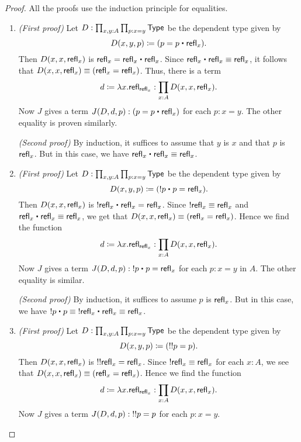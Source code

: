 \begin{proof}
  All the proofs use the induction principle for equalities.
  \begin{enumerate}
  \item \emph{(First proof)} Let $D:\prod_{x,y:A}\prod_{p:x=y} \mathsf{Type}$ be the dependent type given by 
    \begin{equation*}
      D(x,y,p)\coloneqq (p= p\ct \refl{x}).
    \end{equation*}
    Then $D(x,x,\mathsf{refl}_{x})$ is $\refl{x}=\refl{x}\ct\refl{x}$.
    Since $\refl{x}\ct\refl{x}\jdeq\refl{x}$, it follows that $D(x,x,\mathsf{refl}_{x})\equiv (\mathsf{refl}_{x}=\mathsf{refl}_{x})$.
    Thus, there is a term
    \begin{equation*}
      d\coloneqq\lambda x.\mathsf{refl}_{\mathsf{refl}_{x}}:\prod_{x:A} D(x,x,\mathsf{refl}_{x}).
    \end{equation*}
    Now $J$ gives a term $J(D,d,p):(p= p\ct\refl{x})$ for each $p:x= y$.
    The other equality is proven similarly.

    \noindent
    \emph{(Second proof)} By induction, it suffices to assume that $y$ is $x$ and that $p$ is $\mathsf{refl}_{x}$.
    But in this case, we have $\refl{x}\ct\refl{x}\jdeq\refl{x}$.
  \item \emph{(First proof)} Let $D:\prod_{x,y:A}\prod_{p:x=y} \mathsf{Type}$ be the dependent type given by 
    \begin{equation*}
      D(x,y,p)\coloneqq (\opp{p}\ct p=  \refl{x}).
    \end{equation*}
    Then $D(x,x,\mathsf{refl}_{x})$ is $\opp{\refl{x}}\ct\refl{x}=\refl{x}$.
    Since $\mathord{!{\mathsf{refl}_{x}}}\equiv\mathsf{refl}_{x}$ and $\refl{x}\ct\refl{x}\jdeq\refl{x}$, we get that $D(x,x,\mathsf{refl}_{x})\equiv (\mathsf{refl}_{x}=\mathsf{refl}_{x})$.
    Hence we find the function
    \begin{equation*}
      d\coloneqq\lambda x.\mathsf{refl}_{\mathsf{refl}_{x}}:\prod_{x:A} D(x,x,\mathsf{refl}_{x}).
    \end{equation*}
    Now $J$ gives a term $J(D,d,p):\opp{p}\ct p=\refl{x}$ for each $p:x= y$ in $A$.
    The other equality is similar.

    \noindent \emph{(Second proof)} By induction, it suffices to assume $p$ is $\mathsf{refl}_{x}$.
    But in this case, we have $\opp{p} \ct p \jdeq \opp{\refl x} \ct \refl x \jdeq \refl x$.
  \item \emph{(First proof)} Let $D:\prod_{x,y:A} \prod_{p:x=y} \mathsf{Type}$ be the dependent type given by
    \begin{equation*}
      D(x,y,p)\coloneqq (\mathord{!{\mathord{!{p}}}}= p).
    \end{equation*}
    Then $D(x,x,\mathsf{refl}_{x})$ is $\mathord{!{\mathord{!{\mathsf{refl}_{x}}}}}=\mathsf{refl}_{x}$.
    Since $\mathord{!{\mathsf{refl}_{x}}}\equiv \mathsf{refl}_{x}$ for each $x:A$, we see that $D(x,x,\mathsf{refl}_{x})\equiv(\mathsf{refl}_{x}=\mathsf{refl}_{x})$.
    Hence we find the function
    \begin{equation*}
      d\coloneqq\lambda x.\mathsf{refl}_{\mathsf{refl}_{x}}:\prod_{x:A} D(x,x,\mathsf{refl}_{x}).
    \end{equation*}
    Now $J$ gives a term $J(D,d,p):\mathord{!{\mathord{!{p}}}}= p$ for each $p:x= y$.


\end{enumerate}
\end{proof}
